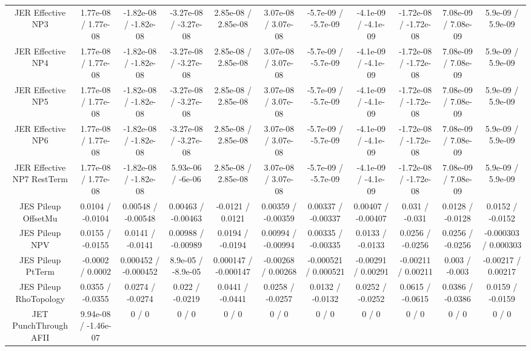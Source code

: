 \begin{table}[htbp]
\begin{center}
\begin{tabular}{|c|c|c|c|c|c|c|c|c|c|c|}
  JER Effective NP3 & 1.77e-08 / 1.77e-08 & -1.82e-08 / -1.82e-08 & -3.27e-08 / -3.27e-08 & 2.85e-08 / 2.85e-08 & 3.07e-08 / 3.07e-08 & -5.7e-09 / -5.7e-09 & -4.1e-09 / -4.1e-09 & -1.72e-08 / -1.72e-08 & 7.08e-09 / 7.08e-09 & 5.9e-09 / 5.9e-09 \\ 
  JER Effective NP4 & 1.77e-08 / 1.77e-08 & -1.82e-08 / -1.82e-08 & -3.27e-08 / -3.27e-08 & 2.85e-08 / 2.85e-08 & 3.07e-08 / 3.07e-08 & -5.7e-09 / -5.7e-09 & -4.1e-09 / -4.1e-09 & -1.72e-08 / -1.72e-08 & 7.08e-09 / 7.08e-09 & 5.9e-09 / 5.9e-09 \\ 
  JER Effective NP5 & 1.77e-08 / 1.77e-08 & -1.82e-08 / -1.82e-08 & -3.27e-08 / -3.27e-08 & 2.85e-08 / 2.85e-08 & 3.07e-08 / 3.07e-08 & -5.7e-09 / -5.7e-09 & -4.1e-09 / -4.1e-09 & -1.72e-08 / -1.72e-08 & 7.08e-09 / 7.08e-09 & 5.9e-09 / 5.9e-09 \\ 
  JER Effective NP6 & 1.77e-08 / 1.77e-08 & -1.82e-08 / -1.82e-08 & -3.27e-08 / -3.27e-08 & 2.85e-08 / 2.85e-08 & 3.07e-08 / 3.07e-08 & -5.7e-09 / -5.7e-09 & -4.1e-09 / -4.1e-09 & -1.72e-08 / -1.72e-08 & 7.08e-09 / 7.08e-09 & 5.9e-09 / 5.9e-09 \\ 
  JER Effective NP7 RestTerm & 1.77e-08 / 1.77e-08 & -1.82e-08 / -1.82e-08 & 5.93e-06 / -6e-06 & 2.85e-08 / 2.85e-08 & 3.07e-08 / 3.07e-08 & -5.7e-09 / -5.7e-09 & -4.1e-09 / -4.1e-09 & -1.72e-08 / -1.72e-08 & 7.08e-09 / 7.08e-09 & 5.9e-09 / 5.9e-09 \\ 
  JES Pileup OffsetMu & 0.0104 / -0.0104 & 0.00548 / -0.00548 & 0.00463 / -0.00463 & -0.0121 / 0.0121 & 0.00359 / -0.00359 & 0.00337 / -0.00337 & 0.00407 / -0.00407 & 0.031 / -0.031 & 0.0128 / -0.0128 & 0.0152 / -0.0152 \\ 
  JES Pileup NPV & 0.0155 / -0.0155 & 0.0141 / -0.0141 & 0.00988 / -0.00989 & 0.0194 / -0.0194 & 0.00994 / -0.00994 & 0.00335 / -0.00335 & 0.0133 / -0.0133 & 0.0256 / -0.0256 & 0.0256 / -0.0256 & -0.000303 / 0.000303 \\ 
  JES Pileup PtTerm & -0.0002 / 0.0002 & 0.000452 / -0.000452 & 8.9e-05 / -8.9e-05 & 0.000147 / -0.000147 & -0.00268 / 0.00268 & -0.000521 / 0.000521 & -0.00291 / 0.00291 & -0.00211 / 0.00211 & 0.003 / -0.003 & -0.00217 / 0.00217 \\ 
  JES Pileup RhoTopology & 0.0355 / -0.0355 & 0.0274 / -0.0274 & 0.022 / -0.0219 & 0.0441 / -0.0441 & 0.0258 / -0.0257 & 0.0132 / -0.0132 & 0.0252 / -0.0252 & 0.0615 / -0.0615 & 0.0386 / -0.0386 & 0.0159 / -0.0159 \\ 
  JET PunchThrough AFII & 9.94e-08 / -1.46e-07 & 0 / 0 & 0 / 0 & 0 / 0 & 0 / 0 & 0 / 0 & 0 / 0 & 0 / 0 & 0 / 0 & 0 / 0 \\ 

\end{tabular}
\end{center}
\end{table}
